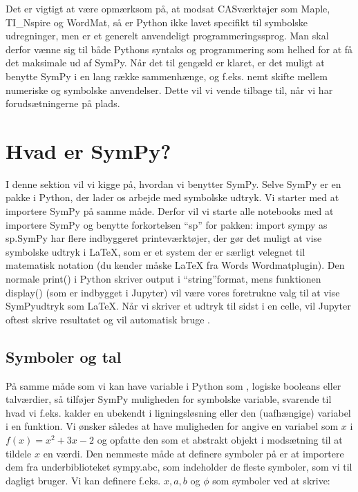 \documentclass[letterpaper,10pt,english]{jupyterBook}
\begin{document}
Det er vigtigt at være opmærksom på, at modsat CAS\sphinxhyphen{}værktøjer som Maple, TI\_Nspire og WordMat, så er Python ikke lavet specifikt til symbolske udregninger, men er et generelt anvendeligt programmeringssprog. Man skal derfor vænne sig til både Pythons syntaks og programmering som helhed for at få det maksimale ud af SymPy. Når det til gengæld er klaret, er det muligt at benytte SymPy i en lang række sammenhænge, og f.eks. nemt skifte mellem numeriske og symbolske anvendelser. Dette vil vi vende tilbage til, når vi har forudsætningerne på plads.


\section{Hvad er SymPy?}
\label{\detokenize{notebooks/sympy/Notebook2:hvad-er-sympy}}\label{\detokenize{notebooks/sympy/Notebook2::doc}}
I denne sektion vil vi kigge på, hvordan vi benytter SymPy. Selve SymPy er en pakke i Python, der lader os arbejde med symbolske udtryk. Vi starter med at importere SymPy på samme måde. Derfor vil vi starte alle notebooks med at importere SymPy og benytte forkortelsen “sp” for pakken: import sympy as sp.SymPy har flere indbyggeret printe\sphinxhyphen{}værktøjer, der gør det muligt at vise symbolske udtryk i LaTeX, som er et \sphinxhyphen{}system der er særligt velegnet til matematisk notation (du kender måske LaTeX fra Words Wordmat\sphinxhyphen{}plugin). Den normale print() i Python skriver output i “string”\sphinxhyphen{}format, mens funktionen display() (som er indbygget i Jupyter) vil være vores foretrukne valg til at vise SymPy\sphinxhyphen{}udtryk som LaTeX. Når vi skriver et udtryk til sidst i en celle, vil Jupyter oftest skrive resultatet og vil automatisk bruge .

\begin{sphinxVerbatim}[commandchars=\\\{\}]
                       
\end{sphinxVerbatim}


\subsection{Symboler og tal}
\label{\detokenize{notebooks/sympy/Notebook2:symboler-og-tal}}
På samme måde som vi kan have variable i Python som , logiske booleans eller talværdier, så tilføjer SymPy muligheden for symbolske variable, svarende til hvad vi f.eks. kalder en ubekendt i ligningsløsning eller den (uafhængige) variabel i en funktion. Vi ønsker således at have muligheden for angive en variabel som \(x\) i \(f(x) = x^2+3x-2\) og opfatte den som et abstrakt objekt i modsætning til at tildele \(x\) en værdi. Den nemmeste måde at definere symboler på er at importere dem fra underbiblioteket sympy.abc, som indeholder de fleste symboler, som vi til dagligt bruger. Vi kan definere f.eks. \(x, a, b\) og \(\phi\) som symboler ved at skrive:
\end{document}
